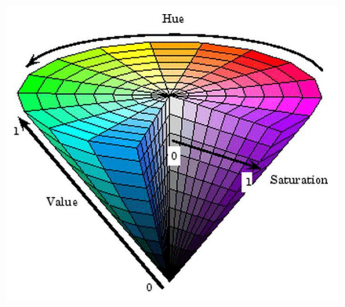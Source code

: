 \documentclass{report}
\begin{document}
\begin{figure}[H]
\includegraphics[scale=0.3]{Images/hsv.png}
\centering
\end{figure}
\end{document}
